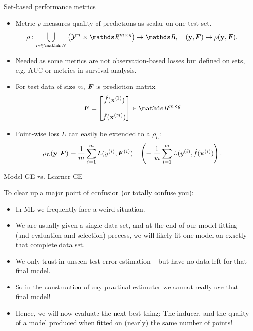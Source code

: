\documentclass[11pt,compress,t,notes=noshow, xcolor=table]{beamer}
\begin{document}
\begin{vbframe}{Set-based performance metrics}
\begin{itemize}
  \item Metric $\rho$ measures quality of predictions as scalar on one test set.
  $$\rho: \preimageRho  \rightarrow \R, \quad (\yv, \F) \mapsto \rho(\yv, \F).$$
  \item Needed as some metrics are not observation-based losses but defined on sets,
      e.g. AUC or metrics in survival analysis. 
  \item For test data of size $m$, $\boldsymbol{F}$ is prediction matrix 
$$\F = \begin{bmatrix} 
\fh(\xi[1]) \\ 
\dots \\
\fh(\xi[m])
\end{bmatrix} \in \R^{m \times g}$$ 
  \item Point-wise loss $L$ can easily be extended to a $\rho_L$:
  $$\rho_L(\mathbf{y}, \boldsymbol{F}) = \frac{1}{m}\sum\limits_{i=1}^m L(y^{(i)}, \boldsymbol{F}^{(i)})  \quad \left(= \frac{1}{m}\sum\limits_{i=1}^m L(y^{(i)}, \hat{f}(\mathbf{x}^{(i)})\right).$$
\end{itemize}
\end{vbframe}




\begin{vbframe}{Model GE vs. Learner GE}

To clear up a major point of confusion (or totally confuse you):
\medskip

\begin{itemize}
  \item In ML we frequently face a weird situation.
  \item We are usually given a single data set, and at the end of our model fitting (and evaluation and selection) process, we will likely fit one model on exactly that 
  complete data set. 
  \item We only trust in unseen-test-error estimation -- but have no data left for that
      final model. 
  \item So in the construction of any practical estimator we cannot really use that final model!


  \item Hence, we will now evaluate the next best thing: The inducer, 
      and the quality of a model produced when fitted on (nearly) the same number of points!
\end{itemize}

\end{vbframe}
\end{document}
